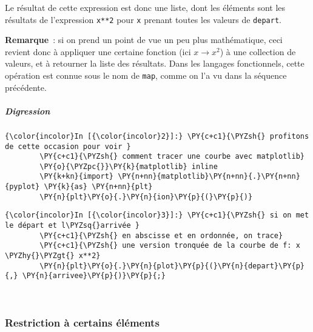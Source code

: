     Le résultat de cette expression est donc une liste, dont les éléments
sont les résultats de l'expression \texttt{x**2} pour \texttt{x} prenant
toutes les valeurs de \texttt{depart}.

    \textbf{Remarque}~: si on prend un point de vue un peu plus
mathématique, ceci revient donc à appliquer une certaine fonction (ici
\(x \rightarrow x^2\)) à une collection de valeurs, et à retourner la
liste des résultats. Dans les langages fonctionnels, cette opération est
connue sous le nom de \texttt{map}, comme on l'a vu dans la séquence
précédente.

    \hypertarget{digression}{%
\subparagraph{Digression}\label{digression}}

    \begin{Verbatim}[commandchars=\\\{\}]
{\color{incolor}In [{\color{incolor}2}]:} \PY{c+c1}{\PYZsh{} profitons de cette occasion pour voir }
        \PY{c+c1}{\PYZsh{} comment tracer une courbe avec matplotlib}
        \PY{o}{\PYZpc{}}\PY{k}{matplotlib} inline
        \PY{k+kn}{import} \PY{n+nn}{matplotlib}\PY{n+nn}{.}\PY{n+nn}{pyplot} \PY{k}{as} \PY{n+nn}{plt}
        \PY{n}{plt}\PY{o}{.}\PY{n}{ion}\PY{p}{(}\PY{p}{)}
\end{Verbatim}


    \begin{Verbatim}[commandchars=\\\{\}]
{\color{incolor}In [{\color{incolor}3}]:} \PY{c+c1}{\PYZsh{} si on met le départ et l\PYZsq{}arrivée }
        \PY{c+c1}{\PYZsh{} en abscisse et en ordonnée, on trace}
        \PY{c+c1}{\PYZsh{} une version tronquée de la courbe de f: x \PYZhy{}\PYZgt{} x**2}
        \PY{n}{plt}\PY{o}{.}\PY{n}{plot}\PY{p}{(}\PY{n}{depart}\PY{p}{,} \PY{n}{arrivee}\PY{p}{)}\PY{p}{;}
\end{Verbatim}


    \begin{center}
    \end{center}
    { \hspace*{\fill} \\}
    
    \hypertarget{restriction-uxe0-certains-uxe9luxe9ments}{%
\subsubsection{Restriction à certains
éléments}\label{restriction-uxe0-certains-uxe9luxe9ments}}

